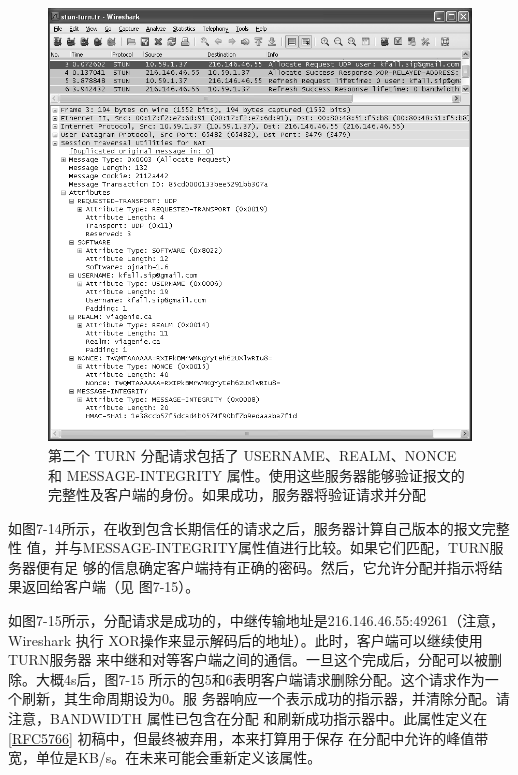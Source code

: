 \begin{figure}[H]
  \centering
  \includegraphics[scale=0.5]{imgs/7/7-14.png}
  \caption{第二个 TURN 分配请求包括了 USERNAME、REALM、NONCE 和 MESSAGE-INTEGRITY
  属性。使用这些服务器能够验证报文的完整性及客户端的身份。如果成功，服务器将验证请求并分配}
\end{figure}

如图7-14所示，在收到包含长期信任的请求之后，服务器计算自己版本的报文完整性
值，并与MESSAGE-INTEGRITY属性值进行比较。如果它们匹配，TURN服务器便有足
够的信息确定客户端持有正确的密码。然后，它允许分配并指示将结果返回给客户端（见
图7-15）。

如图7-15所示，分配请求是成功的，中继传输地址是216.146.46.55:49261（注意，
Wireshark 执行 XOR操作来显示解码后的地址）。此时，客户端可以继续使用TURN服务器
来中继和对等客户端之间的通信。一旦这个完成后，分配可以被删除。大概4s后，图7-15
所示的包5和6表明客户端请求删除分配。这个请求作为一个刷新，其生命周期设为0。服
务器响应一个表示成功的指示器，并清除分配。请注意，BANDWIDTH 属性已包含在分配
和刷新成功指示器中。此属性定义在\href{https://www.rfc-editor.org/rfc/rfc5766}{[RFC5766]}
初稿中，但最终被弃用，本来打算用于保存
在分配中允许的峰值带宽，单位是KB/s。在未来可能会重新定义该属性。

